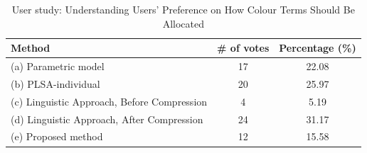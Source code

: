 \begin{table}[H]\centering
\caption{User study: Understanding Users' Preference on How Colour Terms Should Be Allocated}
\begin{tabular}{|l|c|c|}
\hline
\textbf{Method}                             & \textbf{\# of votes} & \textbf{Percentage (\%)} \\ \hline
(a) Parametric model                        & 17                   & 22.08              \\ \hline
(b) PLSA-individual                         & 20                   & 25.97              \\ \hline
(c) Linguistic Approach, Before Compression & 4                    & 5.19              \\ \hline
(d) Linguistic Approach, After Compression  & 24                   & 31.17              \\ \hline
(e) Proposed method                         & 12                   & 15.58              \\ \hline
\end{tabular}
\label{tab:munsell_result}
\end{table}
\vspace{-2em}


